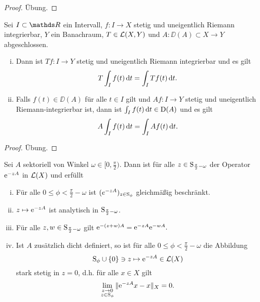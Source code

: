 \begin{proof}
  Übung.
\end{proof}

\begin{prop}
  \label{prop:opInIntegral}
  Sei $I \subset \R$ ein Intervall, $f \colon I \to X$ stetig und uneigentlich Riemann integrierbar, $Y$ ein Banachraum, $T \in \mathcal{L}(X,Y)$ und $A \colon \DD(A) \subset X \to Y$ abgeschlossen.
  \begin{enumerate}[(i)]
    \item Dann ist $Tf \colon I \to Y$ stetig und uneigentlich Riemann integrierbar und es gilt
      $$
      T \int_I f(t) \, {\operatorname{d}\!{t}} = \int_I Tf(t)\, {\operatorname{d}\!{t}}.
      $$
    \item Falls $f(t) \in \DD(A)$ für alle $t \in I$ gilt und $Af \colon I \to Y$ stetig und uneigentlich Riemann-integrierbar ist, dann ist $\int_I f(t) \, {\operatorname{d}\!{t}} \in \mathrm{D}(A)$ und es gilt 
      $$
      A \int_I f(t) \, {\operatorname{d}\!{t}} = \int_I A f(t) \, {\operatorname{d}\!{t}}.
      $$
  \end{enumerate}
\end{prop}

\begin{proof}
  Übung.
\end{proof}

\begin{thm}
  Sei $A$ sektoriell von Winkel $\omega \in [0,\frac{\pi}{2})$.
    Dann ist für alle $z \in \mathrm{S}_{\frac{\pi}{2} - \omega}$ der Operator $\mathrm{e}^{-zA}$ in $\mathcal{L}(X)$ und erfüllt
    \begin{enumerate}[(i)]
      \item Für alle $0 \leq \phi < \frac{\pi}{2} - \omega$ ist $(e^{-zA})_{z \in \mathrm{S}_\phi}$ gleichmäßig beschränkt.
      \item $z \mapsto \mathrm{e}^{-zA}$ ist analytisch in $\mathrm{S}_{\frac{\pi}{2} - \omega}$.
      \item Für alle $z,w \in \mathrm{S}_{\frac{\pi}{2} - \omega}$ gilt 
        $
        \mathrm{e}^{-(z + w)A} = \mathrm{e}^{-zA}\mathrm{e}^{-w A}.
        $
      \item Ist $A$ zusätzlich dicht definiert, so ist für alle $0 \leq \phi < \frac{\pi}{2} - \omega$ die Abbildung
        $$
        \mathrm{S}_\phi \cup \{0\} \ni z \mapsto \mathrm{e}^{-z A} \in \mathcal{L}(X)
        $$
        stark stetig in $z = 0$, d.h. für alle $x \in X$ gilt
        $$
        \lim_{\substack{z \to 0 \\ z \in \mathrm{S}_\phi}} \|\mathrm{e}^{-zA} x - x\|_X = 0.
        $$
    \end{enumerate}
\end{thm}

